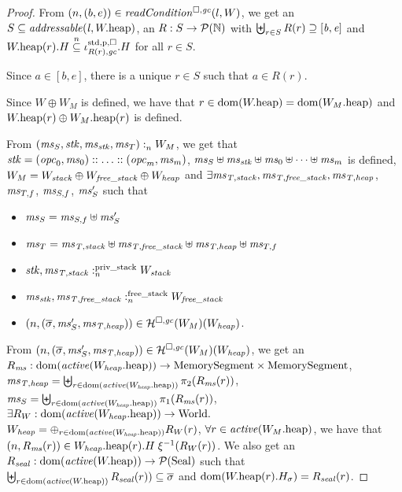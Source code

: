 \begin{proof}
  From $\npair{(b,e)}\in\readCond{l,W}$, we get an $S \subseteq \addressable{\lin,
    \pwheap}$, an $R : S \rightarrow \powerset{\nats}$ with $\biguplus_{r \in S} R(r) \supseteq [\baddr,\eaddr]$ and $\pwheap(r).H
  \nsubeq \stdreg{R(r),\gc}{\pur}.H$ for all $r \in S$.

  Since $a \in [b,e]$, there is a unique $r \in S$ such that $a \in R(r)$.

  Since $W \oplus W_M$ is defined, we have that $r \in \dom(\pwheap) =
  \dom(\pwheap[W_M])$ and $\pwheap(r) \oplus \pwheap[W_M](r)$ is defined.

  From $\memSat{(\ms_S,\stk,\ms_\stk,\ms_T)}{W_M}$, we get that
  $\stk = (\opc_0,\ms_0):: \dots :: (\opc_m,\ms_m)$,
  $\ms_S \uplus \ms_\stk \uplus \ms_0 \uplus \dots \uplus \ms_m$ is defined,
  $W_M = W_{\var{stack}} \oplus W_{\var{free\_stack}} \oplus W_{\var{heap}}$ and
  $\exists \ms_\var{T,stack}, \ms_\var{T,free\_stack}, \ms_\var{T,heap}$, $\ms_{T,f}$, $\ms_{S,f}$, $\ms_S'$ such that
  \begin{itemize}
  \item $\ms_S =\ms_{S,f} \uplus \ms_S'$
  \item $\ms_T = \ms_\var{T,stack} \uplus \ms_\var{T,free\_stack} \uplus
    \ms_\var{T,heap} \uplus \ms_{T,f}$
  \item $\memSatStack{\stk,\ms_\var{T,stack}}{W_{\var{stack}}}$
  \item $\memSatFStack{\ms_\stk,\ms_\var{T,free\_stack}}{W_{\var{free\_stack}}}$
  \item $\npair{(\overline{\sigma},\ms_S',\ms_\var{T,heap})} \in \lrheap(W_M)(W_\var{heap})$.
  \end{itemize}

  From $\npair{(\overline{\sigma},\ms_S',\ms_\var{T,heap})} \in \lrheap(W_M)(W_\var{heap})$, we get an
  $R_\ms : \dom(\activeReg{\pwheap[W_\var{heap}]}) \fun \MemSeg \times \MemSeg$,
  $\ms_\var{T,heap} = \biguplus_{r \in \dom(\activeReg{\pwheap[W_\var{heap}]})} \pi_2(R_\ms(r))$,
  $\ms_S = \biguplus_{r \in \dom(\activeReg{\pwheap[W_\var{heap}]})} \pi_1(R_\ms(r))$,
  $\exists R_W : \dom(\activeReg{\pwheap[W_\var{heap}]}) \fun \World\ldotp$
  $W_\var{heap} = \oplus_{r \in \dom(\activeReg{\pwheap[W_\var{heap}]})} R_W(r)$,
  $\forall r \in \activeReg{\pwheap[W_M]}$, we have that
  $\npair{R_\ms(r)} \in  \pwheap[W_\var{heap}](r).H \; \xi^{-1}(R_W(r))$.
  We also get an $R_\var{seal} : \dom(\activeReg{\pwheap}) \fun \powerset{\Seal}$ such that  $\biguplus_{r \in \dom(\activeReg{\pwheap})} R_\var{seal}(r)) \subseteq \overline{\sigma}$ and $\dom(\pwheap(r).H_\sigma) = R_\var{seal}(r)$.


\end{proof}
